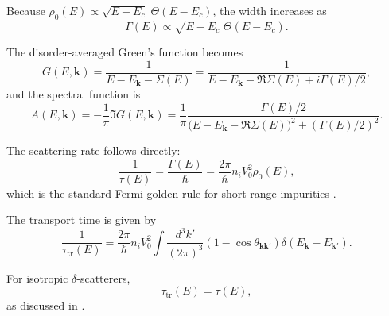Because $\rho_0(E) \propto \sqrt{E - E_c} \;\Theta(E - E_c)$, the width increases as
\begin{equation}
\Gamma(E) \propto \sqrt{E - E_c} \;\Theta(E - E_c).
\end{equation}


The disorder-averaged Green's function becomes
\begin{equation}
G(E,\mathbf{k}) = 
\frac{1}{E - E_{\mathbf{k}} -\Sigma(E)} = 
\frac{1}{E - E_{\mathbf{k}} - \Re\Sigma(E) + i \Gamma(E)/2},
\end{equation}
and the spectral function is \cite{Mahan2000}
\begin{equation}
A(E,\mathbf{k}) = 
-\frac{1}{\pi}\Im G(E,\mathbf{k})
= \frac{1}{\pi}
\frac{\Gamma(E)/2}{
       \big(E - E_{\mathbf{k}} - \Re\Sigma(E)\big)^2
     + (\Gamma(E)/2)^2 }.
\end{equation}


The scattering rate follows directly:
\begin{equation}
\frac{1}{\tau(E)} = \frac{\Gamma(E)}{\hbar}
 = \frac{2\pi}{\hbar} n_i V_0^2 \rho_0(E),
\end{equation}
which is the standard Fermi golden rule for short-range impurities \cite{Mahan2000,Kittel2005}.


The transport time is given by \cite{Mahan2000}
\begin{equation}
\frac{1}{\tau_{\mathrm{tr}}(E)} =
\frac{2\pi}{\hbar} n_i V_0^2
\int \frac{d^3 k'}{(2\pi)^3}
(1 - \cos\theta_{\mathbf{k}\mathbf{k}'})
\delta(E_{\mathbf{k}} - E_{\mathbf{k}'}).
\end{equation}

For isotropic $\delta$-scatterers,
\begin{equation}
\tau_{\mathrm{tr}}(E) = \tau(E),
\end{equation}
as discussed in \cite{Mahan2000,Schirmacher2009}.

